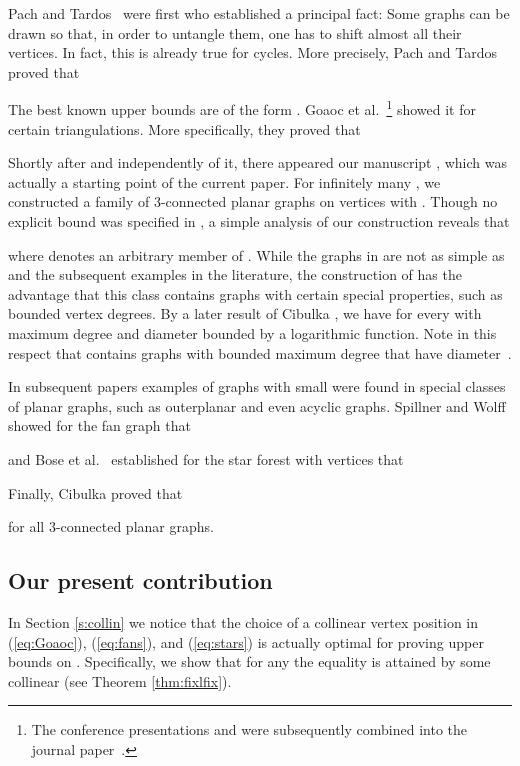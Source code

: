 \documentclass[reqno,12pt]{amsart}
\newcommand{\refeq}[1]{(\ref{eq:#1})}
\begin{document}
Pach and Tardos~\cite{PTa} were first who established a principal fact:
Some graphs can be drawn so that, in order to untangle them, one has
to shift almost all their vertices. In fact, 
this is already true for cycles.
More precisely,  Pach and Tardos~\cite{PTa} proved that



The best known upper bounds are of the form .
Goaoc et al.\ \cite{Goaoc}\footnote{The conference presentations \cite{Goaoc} and \cite{SWo} were subsequently combined
into the journal paper~\cite{merged}.}
showed it for certain triangulations. 
More specifically, they proved that


Shortly after \cite{Goaoc} and independently of it,
there appeared our manuscript \cite{KSchV}, which was actually 
a starting point of the current paper. For infinitely many ,
we constructed a family  of 3-connected
planar graphs on  vertices with . Though no explicit bound was
specified in \cite{KSchV}, a simple analysis of our construction
reveals that

where  denotes an arbitrary member of .
While the graphs in  are not as simple as  and the subsequent examples in the
literature, the construction of  has the advantage that this class contains graphs with
certain special properties, such as bounded vertex degrees.
By a later result of Cibulka \cite{Cib}, we have 
for every  with maximum degree and diameter bounded by a logarithmic function. 
Note in this respect that  contains graphs with bounded maximum degree that
have diameter~.

In subsequent papers \cite{SWo,Bose} examples of graphs with small 
were found in special classes of planar graphs, such
as outerplanar and even acyclic graphs.
Spillner and Wolff \cite{SWo} showed for the fan graph that

and Bose et al.\ \cite{Bose} established for the star forest with  vertices that

Finally, Cibulka \cite{Cib} proved that

for all 3-connected planar graphs.


\subsection{Our present contribution}\label{ss:contrib}
In Section \ref{s:collin} we notice that the choice of a collinear
vertex position in \refeq{Goaoc}, \refeq{fans}, and \refeq{stars}
is actually optimal for proving upper bounds on .
Specifically, we show that for any  the equality 
is attained by some collinear  (see Theorem \ref{thm:fixlfix}).
\end{document}
